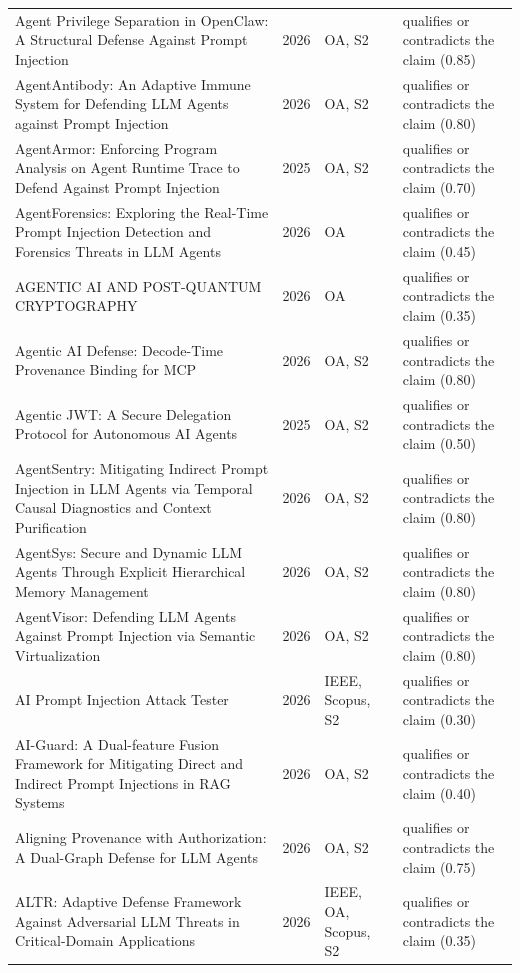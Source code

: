 \begin{longtable}{@{}%
  >{\raggedright\arraybackslash}p{}c%
  >{\raggedright\arraybackslash}p{}%
  >{\raggedright\arraybackslash}p{}@{}}
Agent Privilege Separation in OpenClaw: A Structural Defense Against Prompt Injection & 2026 & OA, S2 & qualifies or contradicts the claim (0.85) \\
AgentAntibody: An Adaptive Immune System for Defending LLM Agents against Prompt Injection & 2026 & OA, S2 & qualifies or contradicts the claim (0.80) \\
AgentArmor: Enforcing Program Analysis on Agent Runtime Trace to Defend Against Prompt Injection & 2025 & OA, S2 & qualifies or contradicts the claim (0.70) \\
AgentForensics: Exploring the Real-Time Prompt Injection Detection and Forensics Threats in LLM Agents & 2026 & OA & qualifies or contradicts the claim (0.45) \\
AGENTIC AI AND POST-QUANTUM CRYPTOGRAPHY & 2026 & OA & qualifies or contradicts the claim (0.35) \\
Agentic AI Defense: Decode-Time Provenance Binding for MCP & 2026 & OA, S2 & qualifies or contradicts the claim (0.80) \\
Agentic JWT: A Secure Delegation Protocol for Autonomous AI Agents & 2025 & OA, S2 & qualifies or contradicts the claim (0.50) \\
AgentSentry: Mitigating Indirect Prompt Injection in LLM Agents via Temporal Causal Diagnostics and Context Purification & 2026 & OA, S2 & qualifies or contradicts the claim (0.80) \\
AgentSys: Secure and Dynamic LLM Agents Through Explicit Hierarchical Memory Management & 2026 & OA, S2 & qualifies or contradicts the claim (0.80) \\
AgentVisor: Defending LLM Agents Against Prompt Injection via Semantic Virtualization & 2026 & OA, S2 & qualifies or contradicts the claim (0.80) \\
AI Prompt Injection Attack Tester & 2026 & IEEE, Scopus, S2 & qualifies or contradicts the claim (0.30) \\
AI-Guard: A Dual-feature Fusion Framework for Mitigating Direct and Indirect Prompt Injections in RAG Systems & 2026 & OA, S2 & qualifies or contradicts the claim (0.40) \\
Aligning Provenance with Authorization: A Dual-Graph Defense for LLM Agents & 2026 & OA, S2 & qualifies or contradicts the claim (0.75) \\
ALTR: Adaptive Defense Framework Against Adversarial LLM Threats in Critical-Domain Applications & 2026 & IEEE, OA, Scopus, S2 & qualifies or contradicts the claim (0.35) \\

\end{longtable}
